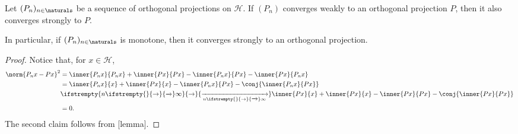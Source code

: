 \documentclass[article, a4paper, 11pt, oneside]{memoir}
\numberwithin{equation}{chapter}
\newcommand{\calE}{\mathcal{E}}
\newcommand{\calH}{\mathcal{H}}
\renewcommand\to[1][]{%
    \ifstrempty{#1}{%
        \rightarrow
    }{%
        \xrightarrow[#1]{}
    }%
}
\begin{document}
\begin{proposition}
    Let $(P_n)_{n\in\naturals}$ be a sequence of orthogonal projections on $\calH$. If $(P_n)$ converges weakly to an orthogonal projection $P$, then it also converges strongly to $P$.

    In particular, if $(P_n)_{n\in\naturals}$ is monotone, then it converges strongly to an orthogonal projection.
\end{proposition}

\begin{proof}
    Notice that, for $x \in \calH$,
    \begin{align*}
        \norm{P_n x - Px}^2
            &= \inner{P_n x}{P_n x}
               + \inner{Px}{Px}
               - \inner{P_n x}{Px}
               - \inner{Px}{P_n x} \\
            &= \inner{P_n x}{x}
            + \inner{Px}{x}
            - \inner{P_n x}{Px}
            - \conj{\inner{P_n x}{Px}} \\
            &\to[n\to\infty] \inner{Px}{x}
            + \inner{Px}{x}
            - \inner{Px}{Px}
            - \conj{\inner{Px}{Px}} \\
            &= 0.
    \end{align*}
    The second claim follows from [lemma].
\end{proof}


\end{document}
